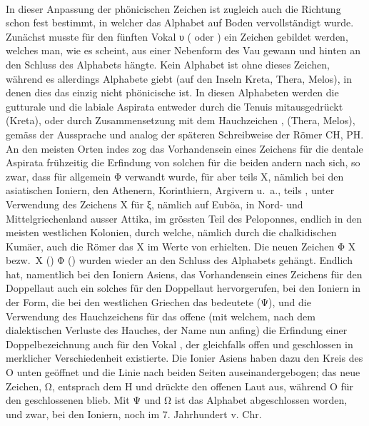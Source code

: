 \paragraph{} In dieser Anpassung der phönicischen Zeichen ist zugleich auch die
Richtung schon fest bestimmt, in welcher das Alphabet auf  Boden
vervollständigt wurde.
Zunächst musste für den fünften Vokal υ ( oder ) ein Zeichen gebildet werden,
welches man, wie es scheint, aus einer Nebenform des Vau gewann und hinten an
den Schluss des Alphabets hängte.
Kein  Alphabet ist ohne dieses Zeichen, während es allerdings
Alphabete giebt (auf den Inseln Kreta, Thera, Melos), in denen dies das einzig
nicht phönicische ist.
In diesen Alphabeten werden die gutturale und die labiale Aspirata entweder
durch die Tenuis mitausgedrückt (Kreta), oder durch Zusammensetzung mit dem
Hauchzeichen ,  (Thera, Melos), gemäss
der Aussprache und analog der späteren Schreibweise der Römer CH, PH\@.
An den meisten Orten indes zog das Vorhandensein eines Zeichens für die dentale
Aspirata frühzeitig die Erfindung von solchen für die beiden andern nach sich,
so zwar, dass für  allgemein Φ verwandt wurde, für  aber teils X, nämlich
bei den asiatischen Ioniern, den Athenern, Korinthiern, Argivern u.~a., teils
, unter Verwendung des Zeichens X für ξ, nämlich auf Euböa,
in Nord- und Mittelgriechenland ausser Attika, im grössten Teil des Peloponnes,
endlich in den meisten westlichen Kolonien, durch welche, nämlich durch die
chalkidischen Kumäer, auch die Römer das X im Werte von  erhielten.
Die neuen Zeichen Φ X bezw.~X () Φ  () wurden
wieder an den Schluss des Alphabets gehängt.
Endlich hat, namentlich bei den Ioniern Asiens, das Vorhandensein eines Zeichens
für den Doppellaut  auch ein solches für den Doppellaut 
hervorgerufen, bei
den Ioniern in der Form, die bei den westlichen Griechen das  bedeutete (Ψ),
und die Verwendung des Hauchzeichens für das offene  (mit welchem, nach dem
dialektischen Verluste des Hauches, der Name nun anfing) die Erfindung einer
Doppelbezeichnung auch für den Vokal , der gleichfalls offen und geschlossen in
merklicher Verschiedenheit existierte.
Die Ionier Asiens haben dazu den Kreis des O unten geöffnet und die Linie nach
beiden Seiten auseinandergebogen; das neue Zeichen, Ω, entsprach dem H und
drückte den offenen Laut aus, während O für den geschlossenen blieb.
Mit Ψ und Ω ist das Alphabet abgeschlossen worden, und zwar, bei den Ioniern,
noch im 7. Jahrhundert v. Chr.

